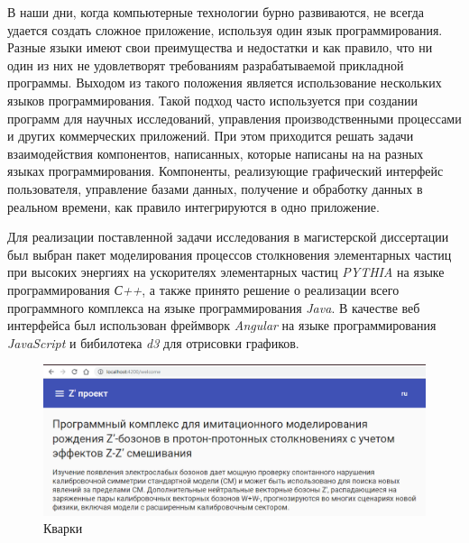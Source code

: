 В наши дни, когда компьютерные технологии бурно развиваются, не
всегда удается создать сложное приложение, используя один язык
программирования. Разные языки имеют свои преимущества и недостатки и как
правило, что ни один из них не удовлетворят требованиям разрабатываемой
прикладной программы. Выходом из такого положения является использование
нескольких языков программирования. Такой подход часто используется при
создании программ для научных исследований, управления производственными
процессами и других коммерческих приложений. При этом приходится решать
задачи взаимодействия компонентов, написанных, которые написаны на на
разных языках программирования. Компоненты, реализующие графический
интерфейс пользователя, управление базами данных, получение и обработку
данных в реальном времени, как правило интегрируются в одно приложение.

Для реализации поставленной задачи исследования в магистерской
диссертации был выбран пакет моделирования процессов столкновения элементарных частиц при высоких энергиях на ускорителях элементарных частиц \textit{PYTHIA} на языке программирования \textit{С++}, а также принято решение о реализации всего программного
комплекса на языке программирования \textit{Java}.
В качестве веб интерфейса был использован фреймворк \textit{Angular} на языке программирования \textit{JavaScript} и бибилотека \textit{d3} для отрисовки графиков.

\begin{figure}[h]
	\centering
	\includegraphics[width=\textwidth]{figures/welcome-page.png}
	\caption{Кварки}
	\label{fig:welcome-page}
\end{figure}
